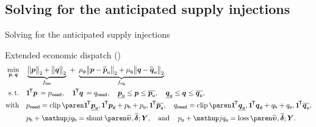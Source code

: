 \subsection{Solving for the anticipated supply injections}

\begin{frame}[t]{Solving for the anticipated supply injections}{}
    \begin{block}{Extended economic dispatch (\XED)}
    \vspace{-1em}
    \begin{align*}
        \operatornamewithlimits{min}_{\RealVec{p},\,\RealVec{q}}
        \quad &
        \underbrace{
            \Norm*{\begin{matrix*}\RealVec{p}\end{matrix*}}_{2}
            +
            \Norm*{\begin{matrix*}\RealVec{q}\end{matrix*}}_{2}
        }_{\XEDObj{loss}}
        \ + \
        \underbrace{
            \XEDReg{p} \Norm*{\begin{matrix*}\RealVec{p} - \SnapSupPs\end{matrix*}}_{2}
            +
            \XEDReg{q} \Norm*{\begin{matrix*}\RealVec{q} - \SnapSupQs\end{matrix*}}_{2}
            }_{\XEDObj{reg}} \\
        \operatorname{s.t.} \quad &
        \OnesVec^{\!\mathsf{T}} \RealVec{p} \,= p_{\mathsf{need}}, \quad
        \OnesVec^{\!\mathsf{T}} \RealVec{q} \,= q_{\mathsf{need}}, \quad
        \SupPmins \leq \RealVec{p} \leq \SupPmaxs, \quad
        \SupQmins \leq \RealVec{q} \leq \SupQmaxs,
        \\
        \operatorname{with} \quad &
        p_{\mathsf{need}} = \Clip{%
            \OnesVec^{\!\mathsf{T}} \DemPs + p_{\mathsf{h}} + p_{\mathsf{o}}%
        }{\OnesVec^{\!\mathsf{T}} \SupPmins}{\OnesVec^{\!\mathsf{T}} \SupPmaxs},
        \quad
        q_{\mathsf{need}} = \Clip{%
            \OnesVec^{\!\mathsf{T}} \DemQs + q_{\mathsf{h}} + q_{\mathsf{o}}%
        }{\OnesVec^{\!\mathsf{T}} \SupQmins}{\OnesVec^{\!\mathsf{T}} \SupQmaxs},
        \\
        \quad &
        p_{\mathsf{h}} + \ImagUnit q_{\mathsf{h}} = \XEDShun{\SnapBusMs,\SnapBusAs;\Ybus},
        \quad \operatorname{and} \quad
        p_{\mathsf{o}} + \ImagUnit q_{\mathsf{o}} = \XEDLoss{\SnapBusMs,\SnapBusAs;\Ybus}.
    \end{align*}
    \end{block}


\end{frame}
